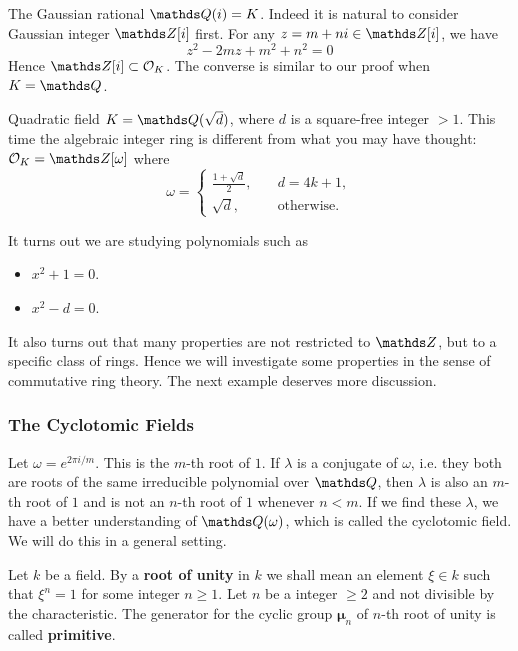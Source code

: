 			\begin{example}
				The Gaussian rational $\Q(i)=K$. Indeed it is natural to consider Gaussian integer $\Z[i]$ first. For any $z=m+ni \in \Z[i]$, we have
				\[
				z^2-2mz+m^2+n^2=0
				\]
				Hence $\Z[i] \subset \OK$. The converse is similar to our proof when $K=\Q$.
			\end{example}
			
			\begin{example}
				Quadratic field $K=\Q(\sqrt{d})$, where $d$ is a square-free integer $>1$. This time the algebraic integer ring is different from what you may have thought: $\OK = \Z[\omega]$ where
				\[
				\omega = \begin{cases}
					\frac{1+\sqrt{d}}{2}, &\quad d = 4k+1, \\
					\sqrt{d}, &\quad \text{otherwise}.
				\end{cases}
				\]
			\end{example}
			It turns out we are studying polynomials such as
			\begin{itemize}
				\item $x^2+1=0$.
				\item $x^2-d=0$.
			\end{itemize}
			It also turns out that many properties are not restricted to $\Z$, but to a specific class of rings. Hence we will investigate some properties in the sense of commutative ring theory. The next example deserves more discussion.
			
			\subsubsection{The Cyclotomic Fields}
				Let $\omega = e^{2\pi i/m}$. This is the $m$-th root of $1$. If $\lambda$ is a conjugate of $\omega$, i.e. they both are roots of the same irreducible polynomial over $\Q$, then $\lambda$ is also an $m$-th root of $1$ and is not an $n$-th root of $1$ whenever $n<m$. If we find these $\lambda$, we have a better understanding of $\Q(\omega)$, which is called the cyclotomic field. We will do this in a general setting.
				
				\begin{definition}
					Let $k$ be a field. By a \textbf{root of unity} in $k$ we shall mean an element $\xi \in k$ such that $\xi^n=1$ for some integer $n \ge 1$. Let $n$ be a integer $\ge 2$ and not divisible by the characteristic. The generator for the cyclic group $\bm{\mu}_n$ of $n$-th root of unity is called \textbf{primitive}.
				\end{definition}
				
